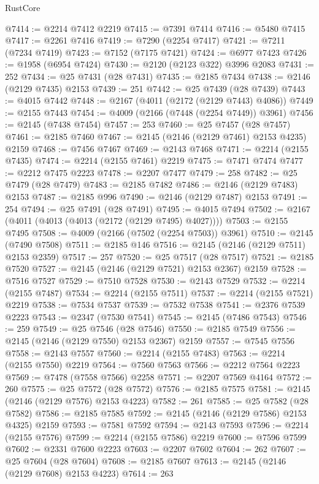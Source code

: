 \begin{lexlean}{RustCore}
\begin{coremodule}
@7414 := @2214 @7412 @2219
@7415 := @7391 @7414
@7416 := @5480 @7415
@7417 := @2261 @7416
@7419 := @7290 (@2254 @7417)
@7421 := @7211 (@7234 @7419)
@7423 := @7152 (@7175 @7421)
@7424 := @6977 @7423
@7426 := @1958 (@6954 @7424)
@7430 := @2120 (@2123 @322) @3996 @2083
@7431 := 252
@7434 := @25 @7431 (@28 @7431)
@7435 := @2185 @7434
@7438 := @2146 (@2129 @7435) @2153
@7439 := 251
@7442 := @25 @7439 (@28 @7439)
@7443 := @4015 @7442
@7448 := @2167 (@4011 (@2172 (@2129 @7443) @4086))
@7449 := @2155 @7443
@7454 := @4009 (@2166 (@7448 (@2254 @7449)) @3961)
@7456 := @2145 (@7438 @7454)
@7457 := 253
@7460 := @25 @7457 (@28 @7457)
@7461 := @2185 @7460
@7467 := @2145 (@2146 (@2129 @7461) @2153 @4235) @2159
@7468 := @7456 @7467
@7469 := @2143 @7468
@7471 := @2214 (@2155 @7435)
@7474 := @2214 (@2155 @7461) @2219
@7475 := @7471 @7474
@7477 := @2212 @7475 @2223
@7478 := @2207 @7477
@7479 := 258
@7482 := @25 @7479 (@28 @7479)
@7483 := @2185 @7482
@7486 := @2146 (@2129 @7483) @2153
@7487 := @2185 @996
@7490 := @2146 (@2129 @7487) @2153
@7491 := 254
@7494 := @25 @7491 (@28 @7491)
@7495 := @4015 @7494
@7502 := @2167 (@4011 (@4013 (@4013 (@2172 (@2129 @7495) @4027))))
@7503 := @2155 @7495
@7508 := @4009 (@2166 (@7502 (@2254 @7503)) @3961)
@7510 := @2145 (@7490 @7508)
@7511 := @2185 @146
@7516 := @2145 (@2146 (@2129 @7511) @2153 @2359)
@7517 := 257
@7520 := @25 @7517 (@28 @7517)
@7521 := @2185 @7520
@7527 := @2145 (@2146 (@2129 @7521) @2153 @2367) @2159
@7528 := @7516 @7527
@7529 := @7510 @7528
@7530 := @2143 @7529
@7532 := @2214 (@2155 @7487)
@7534 := @2214 (@2155 @7511)
@7537 := @2214 (@2155 @7521) @2219
@7538 := @7534 @7537
@7539 := @7532 @7538
@7541 := @2376 @7539 @2223
@7543 := @2347 (@7530 @7541)
@7545 := @2145 (@7486 @7543)
@7546 := 259
@7549 := @25 @7546 (@28 @7546)
@7550 := @2185 @7549
@7556 := @2145 (@2146 (@2129 @7550) @2153 @2367) @2159
@7557 := @7545 @7556
@7558 := @2143 @7557
@7560 := @2214 (@2155 @7483)
@7563 := @2214 (@2155 @7550) @2219
@7564 := @7560 @7563
@7566 := @2212 @7564 @2223
@7569 := @7478 (@7558 @7566) @2258
@7571 := @2207 @7569 @4164
@7572 := 260
@7575 := @25 @7572 (@28 @7572)
@7576 := @2185 @7575
@7581 := @2145 (@2146 (@2129 @7576) @2153 @4223)
@7582 := 261
@7585 := @25 @7582 (@28 @7582)
@7586 := @2185 @7585
@7592 := @2145 (@2146 (@2129 @7586) @2153 @4325) @2159
@7593 := @7581 @7592
@7594 := @2143 @7593
@7596 := @2214 (@2155 @7576)
@7599 := @2214 (@2155 @7586) @2219
@7600 := @7596 @7599
@7602 := @2331 @7600 @2223
@7603 := @2207 @7602
@7604 := 262
@7607 := @25 @7604 (@28 @7604)
@7608 := @2185 @7607
@7613 := @2145 (@2146 (@2129 @7608) @2153 @4223)
@7614 := 263

\end{coremodule}
\end{lexlean}
